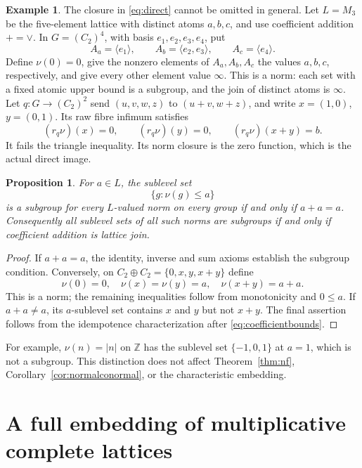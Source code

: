 \documentclass[12pt,a4paper]{amsart}
\newtheorem{proposition}[theorem]{Proposition}
\theoremstyle{definition}
\newtheorem{example}[theorem]{Example}
\newcommand{\Z}{\mathbb Z}
\begin{document}
\begin{example}\label{ex:closure}
The closure in \eqref{eq:direct} cannot be omitted in general. Let $L=M_3$ be the five-element lattice with distinct atoms $a,b,c$, and use coefficient addition $+=\vee$.
In $G=(C_2)^4$, with basis $e_1,e_2,e_3,e_4$, put
\[
 A_a=\langle e_1\rangle,\qquad
 A_b=\langle e_2,e_3\rangle,\qquad
 A_c=\langle e_4\rangle.
\]
Define $\nu(0)=0$, give the nonzero elements of $A_a,A_b,A_c$ the values $a,b,c$, respectively, and give every other element value $\infty$. This is a norm: each set with a fixed atomic upper bound is a subgroup, and the join of distinct atoms is $\infty$.
Let $q:G\to(C_2)^2$ send $(u,v,w,z)$ to $(u+v,w+z)$, and write $x=(1,0)$, $y=(0,1)$. Its raw fibre infimum satisfies
\[
                 (r_q\nu)(x)=0,\qquad
                 (r_q\nu)(y)=0,\qquad
                 (r_q\nu)(x+y)=b.
\]
It fails the triangle inequality. Its norm closure is the zero function, which is the actual direct image.
\end{example}

\begin{proposition}\label{prop:cuts}
For $a\in L$, the sublevel set
\[
                              \{g:\nu(g)\leq a\}
\]
is a subgroup for every $L$-valued norm on every group if and only if $a+a=a$. Consequently all sublevel sets of all such norms are subgroups if and only if coefficient addition is lattice join.
\end{proposition}
\begin{proof}
If $a+a=a$, the identity, inverse and sum axioms establish the subgroup condition.
Conversely, on $C_2\oplus C_2=\{0,x,y,x+y\}$ define
\[
                    \nu(0)=0,\quad
                    \nu(x)=\nu(y)=a,\quad
                    \nu(x+y)=a+a.
\]
This is a norm; the remaining inequalities follow from monotonicity and $0\leq a$. If $a+a\ne a$, its $a$-sublevel set contains $x$ and $y$ but not $x+y$. The final assertion follows from the idempotence characterization after \eqref{eq:coefficientbounds}.
\end{proof}

For example, $\nu(n)=|n|$ on $\Z$ has the sublevel set $\{-1,0,1\}$ at $a=1$, which is not a subgroup. This distinction does not affect Theorem~\ref{thm:nf}, Corollary~\ref{cor:normalconormal}, or the characteristic embedding.


\section{A full embedding of multiplicative complete lattices}\label{sec:full}
\end{document}
